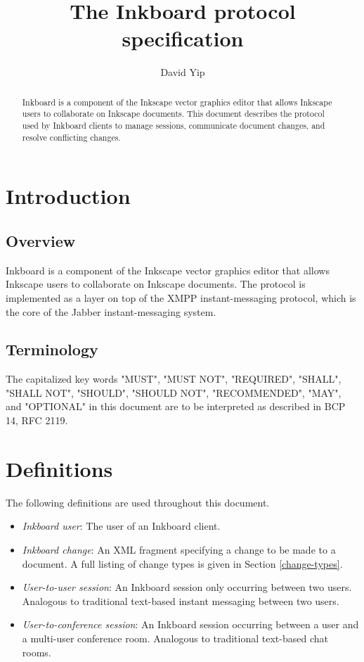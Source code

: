 \documentclass[11pt]{article}
\begin{document}
\title{The Inkboard protocol specification}
\author{David Yip}
\maketitle

\begin{abstract}
Inkboard is a component of the Inkscape vector graphics editor that allows Inkscape users to collaborate on Inkscape documents.  This document describes the protocol used by Inkboard clients to manage sessions, communicate document changes, and resolve conflicting changes.
\end{abstract}

\tableofcontents

\section{Introduction}
\subsection{Overview}
Inkboard is a component of the Inkscape vector graphics editor that allows Inkscape users to collaborate on Inkscape documents.  The protocol is implemented as a layer on top of the XMPP instant-messaging protocol\cite{rfc3920}, which is the core of the Jabber instant-messaging system.

\subsection{Terminology}
The capitalized key words "MUST", "MUST NOT", "REQUIRED", "SHALL", "SHALL NOT", "SHOULD", "SHOULD NOT", "RECOMMENDED", "MAY", and "OPTIONAL" in this document are to be interpreted as described in BCP 14, RFC 2119\cite{rfc2119}.

\section{Definitions}
The following definitions are used throughout this document.
\begin{itemize}
\item {\em Inkboard user}: The user of an Inkboard client.  
\item {\em Inkboard change}: An XML fragment specifying a change to be made to a document.  A full listing of change types is given in Section \ref{change-types}.
\item {\em User-to-user session}: An Inkboard session only occurring between two users.  Analogous to traditional text-based instant messaging between two users.
\item {\em User-to-conference session}: An Inkboard session occurring between a user and a multi-user conference room.  Analogous to traditional text-based chat rooms.
\end{itemize}
\end{document}
